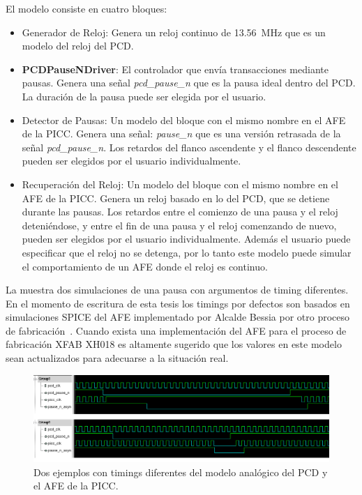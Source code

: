 \documentclass[a4paper, twoside, 11pt]{report}
\begin{document}
El modelo consiste en cuatro bloques:

\begin{itemize}
  \item Generador de Reloj: Genera un reloj continuo de \SI{13.56}{\mega\hertz} que es un modelo del reloj del PCD.
  \item \textbf{PCDPauseNDriver}: El controlador que envía transacciones mediante pausas. Genera una señal \textit{pcd\_pause\_n} que es la pausa ideal dentro del PCD. La duración de la pausa puede ser elegida por el usuario.
  \item Detector de Pausas: Un modelo del bloque con el mismo nombre en el AFE de la PICC. Genera una señal: \textit{pause\_n} que es una versión retrasada de la señal \textit{pcd\_pause\_n}. Los retardos del flanco ascendente y el flanco descendente pueden ser elegidos por el usuario individualmente.
  \item Recuperación del Reloj: Un modelo del bloque con el mismo nombre en el AFE de la PICC. Genera un reloj basado en lo del PCD, que se detiene durante las pausas. Los retardos entre el comienzo de una pausa y el reloj deteniéndose, y entre el fin de una pausa y el reloj comenzando de nuevo, pueden ser elegidos por el usuario individualmente. Además el usuario puede especificar que el reloj no se detenga, por lo tanto este modelo puede simular el comportamiento de un AFE donde el reloj es continuo.
\end{itemize}

La  muestra dos simulaciones de una pausa con argumentos de timing diferentes. En el momento de escritura de esta tesis los timings por defectos son basados en simulaciones SPICE del AFE implementado por Alcalde Bessia por otro proceso de fabricación~\cite{fabricio_eamta}. Cuando exista una implementación del AFE para el proceso de fabricación XFAB XH018 es altamente sugerido que los valores en este modelo sean actualizados para adecuarse a la situación real.

\begin{figure}[htb]
  \centering
  \includegraphics[width=1.0\textwidth]{./img/analogue_sim}
  \caption{Dos ejemplos con timings diferentes del modelo analógico del PCD y el AFE de la PICC.}
  \label{fig:afe_sim}
\end{figure}
\end{document}
